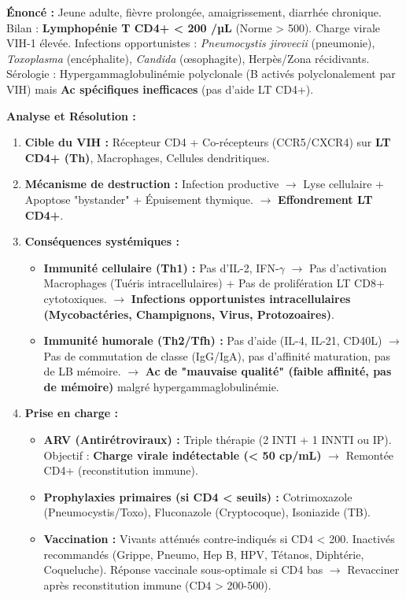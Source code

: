 \documentclass[11pt]{article}
\begin{document}
\begin{exoresolu}
\textbf{Énoncé :} Jeune adulte, fièvre prolongée, amaigrissement, diarrhée chronique. Bilan : \textbf{Lymphopénie T CD4+ < 200 /µL} (Norme > 500). Charge virale VIH-1 élevée. Infections opportunistes : \textit{Pneumocystis jirovecii} (pneumonie), \textit{Toxoplasma} (encéphalite), \textit{Candida} (œsophagite), Herpès/Zona récidivants. Sérologie : Hypergammaglobulinémie polyclonale (B activés polyclonalement par VIH) mais \textbf{Ac spécifiques inefficaces} (pas d'aide LT CD4+).

\textbf{Analyse et Résolution :}
\begin{enumerate}
    \item \textbf{Cible du VIH :} Récepteur CD4 + Co-récepteurs (CCR5/CXCR4) sur \textbf{LT CD4+ (Th)}, Macrophages, Cellules dendritiques.
    \item \textbf{Mécanisme de destruction :} Infection productive $\rightarrow$ Lyse cellulaire + Apoptose "bystander" + Épuisement thymique. $\rightarrow$ \textbf{Effondrement LT CD4+}.
    \item \textbf{Conséquences systémiques :}
        \begin{itemize}
            \item \textbf{Immunité cellulaire (Th1) :} Pas d'IL-2, IFN-$\gamma$ $\rightarrow$ Pas d'activation Macrophages (Tuéris intracellulaires) + Pas de prolifération LT CD8+ cytotoxiques. $\rightarrow$ \textbf{Infections opportunistes intracellulaires (Mycobactéries, Champignons, Virus, Protozoaires)}.
            \item \textbf{Immunité humorale (Th2/Tfh) :} Pas d'aide (IL-4, IL-21, CD40L) $\rightarrow$ Pas de commutation de classe (IgG/IgA), pas d'affinité maturation, pas de LB mémoire. $\rightarrow$ \textbf{Ac de "mauvaise qualité" (faible affinité, pas de mémoire)} malgré hypergammaglobulinémie.
        \end{itemize}
    \item \textbf{Prise en charge :}
        \begin{itemize}
            \item \textbf{ARV (Antirétroviraux) :} Triple thérapie (2 INTI + 1 INNTI ou IP). Objectif : \textbf{Charge virale indétectable (< 50 cp/mL)} $\rightarrow$ Remontée CD4+ (reconstitution immune).
            \item \textbf{Prophylaxies primaires (si CD4 < seuils) :} Cotrimoxazole (Pneumocystis/Toxo), Fluconazole (Cryptocoque), Isoniazide (TB).
            \item \textbf{Vaccination :} Vivants atténués contre-indiqués si CD4 < 200. Inactivés recommandés (Grippe, Pneumo, Hep B, HPV, Tétanos, Diphtérie, Coqueluche). Réponse vaccinale sous-optimale si CD4 bas $\rightarrow$ Revacciner après reconstitution immune (CD4 > 200-500).
        \end{itemize}
\end{enumerate}
\end{exoresolu}
\end{document}
